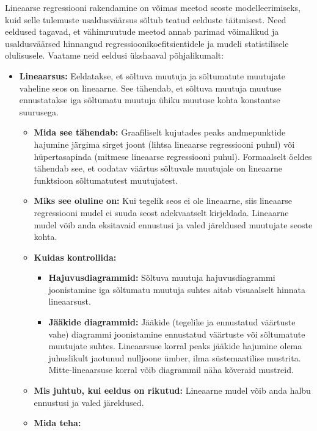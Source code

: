 \documentclass[
]{book}
\providecommand{\tightlist}{%
  \setlength{\itemsep}{0pt}\setlength{\parskip}{0pt}}
\begin{document}
Lineaarse regressiooni rakendamine on võimas meetod seoste modelleerimiseks, kuid selle tulemuste usaldusväärsus sõltub teatud eelduste täitmisest. Need eeldused tagavad, et vähimruutude meetod annab parimad võimalikud ja usaldusväärsed hinnangud regressioonikoefitsientidele ja mudeli statistilisele olulisusele. Vaatame neid eeldusi ükshaaval põhjalikumalt:

\begin{itemize}
\item
  \textbf{Lineaarsus:} Eeldatakse, et sõltuva muutuja ja sõltumatute muutujate vaheline seos on lineaarne. See tähendab, et sõltuva muutuja muutuse ennustatakse iga sõltumatu muutuja ühiku muutuse kohta konstantse suurusega.

  \begin{itemize}
  \tightlist
  \item
    \textbf{Mida see tähendab:} Graafiliselt kujutades peaks andmepunktide hajumine järgima sirget joont (lihtsa lineaarse regressiooni puhul) või hüpertasapinda (mitmese lineaarse regressiooni puhul). Formaalselt öeldes tähendab see, et oodatav väärtus sõltuvale muutujale on lineaarne funktsioon sõltumatutest muutujatest.
  \item
    \textbf{Miks see oluline on:} Kui tegelik seos ei ole lineaarne, siis lineaarse regressiooni mudel ei suuda seost adekvaatselt kirjeldada. Lineaarne mudel võib anda eksitavaid ennustusi ja valed järeldused muutujate seoste kohta.
  \item
    \textbf{Kuidas kontrollida:}

    \begin{itemize}
    \tightlist
    \item
      \textbf{Hajuvusdiagrammid:} Sõltuva muutuja hajuvusdiagrammi joonistamine iga sõltumatu muutuja suhtes aitab visuaalselt hinnata lineaarsust.
    \item
      \textbf{Jääkide diagrammid:} Jääkide (tegelike ja ennustatud väärtuste vahe) diagrammi joonistamine ennustatud väärtuste või sõltumatute muutujate suhtes. Lineaarsuse korral peaks jääkide hajumine olema juhuslikult jaotunud nulljoone ümber, ilma süstemaatilise mustrita. Mitte-lineaarsuse korral võib diagrammil näha kõveraid mustreid.
    \end{itemize}
  \item
    \textbf{Mis juhtub, kui eeldus on rikutud:} Lineaarne mudel võib anda halbu ennustusi ja valed järeldused.
  \item
    \textbf{Mida teha:}


\end{itemize}
\end{itemize}
\end{document}
